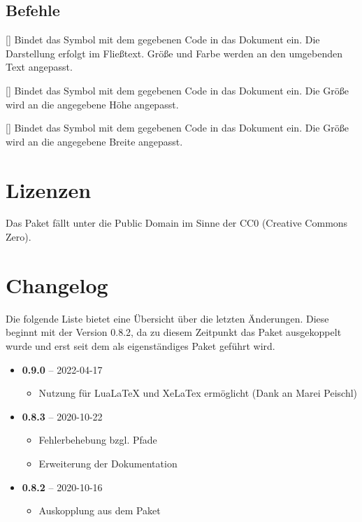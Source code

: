 \documentclass[a4paper,add-index]{cnltx-doc}
\begin{document}
\subsection{Befehle}
\begin{commands}
	[]
	Bindet das Symbol mit dem gegebenen Code in das Dokument ein.
	Die Darstellung erfolgt im Fließtext. Größe und Farbe werden an
	den umgebenden Text angepasst.
\begin{sidebyside}
  \Huge\color{yellow}
\end{sidebyside}
	[]
	Bindet das Symbol mit dem gegebenen Code in das Dokument ein.
	Die Größe wird an die angegebene Höhe angepasst.
\begin{sidebyside}
\end{sidebyside}
	[]
	Bindet das Symbol mit dem gegebenen Code in das Dokument ein.
	Die Größe wird an die angegebene Breite angepasst.
\begin{sidebyside}
\end{sidebyside}
\end{commands}



\section{Lizenzen}
Das Paket  fällt unter die Public Domain im Sinne der CC0 (Creative Commons Zero).


\section{Changelog}
Die folgende Liste bietet eine Übersicht über die letzten Änderungen. Diese beginnt mit der Version 0.8.2, da zu diesem Zeitpunkt das Paket ausgekoppelt wurde und erst seit dem als eigenständiges Paket geführt wird.
\begin{itemize}
    \item \textbf{0.9.0} -- 2022-04-17
        \begin{itemize}
            \item Nutzung für LuaLaTeX und XeLaTex ermöglicht (Dank an Marei Peischl)
        \end{itemize}
    \item \textbf{0.8.3} -- 2020-10-22
        \begin{itemize}
            \item Fehlerbehebung bzgl. Pfade
            \item Erweiterung der Dokumentation
        \end{itemize}
    \item \textbf{0.8.2} -- 2020-10-16
        \begin{itemize}
            \item Auskopplung aus dem Paket 
        \end{itemize}
\end{itemize}
\end{document}
